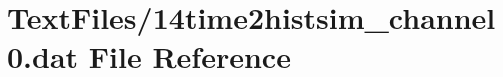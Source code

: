 \hypertarget{14time2histsim__channel0_8dat}{}\section{Text\+Files/14time2histsim\+\_\+channel0.dat File Reference}
\label{14time2histsim__channel0_8dat}
